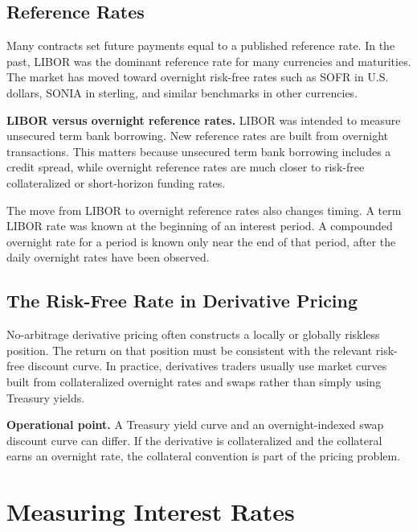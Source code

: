 \subsection{Reference Rates}

Many contracts set future payments equal to a published reference rate. In the
past, LIBOR was the dominant reference rate for many currencies and maturities.
The market has moved toward overnight risk-free rates such as SOFR in U.S.
dollars, SONIA in sterling, and similar benchmarks in other currencies.

\begin{boxD}
\textbf{LIBOR versus overnight reference rates.} LIBOR was intended to measure
unsecured term bank borrowing. New reference rates are built from overnight
transactions. This matters because unsecured term bank borrowing includes a
credit spread, while overnight reference rates are much closer to risk-free
collateralized or short-horizon funding rates.
\end{boxD}

The move from LIBOR to overnight reference rates also changes timing. A term
LIBOR rate was known at the beginning of an interest period. A compounded
overnight rate for a period is known only near the end of that period, after
the daily overnight rates have been observed.

\subsection{The Risk-Free Rate in Derivative Pricing}

No-arbitrage derivative pricing often constructs a locally or globally riskless
position. The return on that position must be consistent with the relevant
risk-free discount curve. In practice, derivatives traders usually use market
curves built from collateralized overnight rates and swaps rather than simply
using Treasury yields.

\begin{boxF}
\textbf{Operational point.} A Treasury yield curve and an overnight-indexed
swap discount curve can differ. If the derivative is collateralized and the
collateral earns an overnight rate, the collateral convention is part of the
pricing problem.
\end{boxF}

\section{Measuring Interest Rates}

